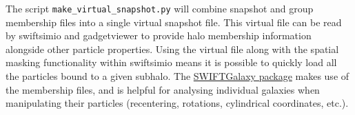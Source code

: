 \documentclass{article}
\begin{document}
The script \verb|make_virtual_snapshot.py| will combine snapshot and group membership files
into a single virtual snapshot file. This virtual file can be read by swiftsimio and 
gadgetviewer to provide halo membership information alongside other particle properties.
Using the virtual file along with the spatial masking functionality within swiftsimio
means it is possible to quickly load all the particles bound to a given subhalo.
The \href{https://swiftgalaxy.readthedocs.io/en/latest/index.html}{SWIFTGalaxy package}
makes use of the membership files, and is helpful for analysing individual galaxies when 
manipulating their particles (recentering, rotations, cylindrical coordinates, etc.).
\end{document}
